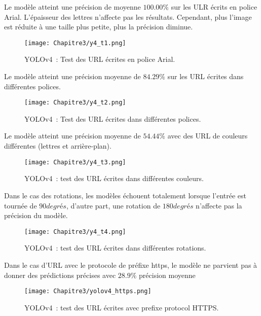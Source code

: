      Le modèle atteint une précision de moyenne $100.00\%$ sur les ULR écrits en police Arial. L'épaisseur des lettres n'affecte pas les résultats. Cependant, plus l'image est réduite à une taille plus petite, plus la précision diminue.
     \begin{figure}[H]
               \centering
               \texttt{[image: Chapitre3/y4\_t1.png]}
               \caption{YOLOv4 : Test des URL écrites en police Arial.}
               \label{y4_t1}
               \end{figure}
     
     Le modèle atteint une précision moyenne de $84.29\%$ sur les URL écrites dans différentes polices.
     \begin{figure}[H]
               \centering
               \texttt{[image: Chapitre3/y4\_t2.png]}
               \caption{YOLOv4 : Test des URL écrites dans différentes polices.}
               \label{y4_t2}
               \end{figure}

     Le modèle atteint une précision moyenne de $54.44\%$ avec des URL de couleurs différentes (lettres et arrière-plan).
     \begin{figure}[H]
               \centering
               \texttt{[image: Chapitre3/y4\_t3.png]}
               \caption{YOLOv4 : test des URL écrites dans différentes couleurs.}
               \label{y4_t3}
               \end{figure}

     Dans le cas des rotations, les modèles échouent totalement lorsque l'entrée est tournée de $90 degrés$, d'autre part, une rotation de $180 degrés$ n'affecte pas la précision du modèle.
     \begin{figure}[H]
               \centering
               \texttt{[image: Chapitre3/y4\_t4.png]}
               \caption{YOLOv4 : test des URL écrites dans différentes rotations.}
               \label{y4_t4}
               \end{figure}
     
     Dans le cas d'URL avec le protocole de préfixe https, le modèle ne parvient pas à donner des prédictions précises avec $28.9\%$ précision moyenne
     \begin{figure}[H]
               \centering
               \texttt{[image: Chapitre3/yolov4\_https.png]}
               \caption{YOLOv4 : test des URL écrites avec prefixe protocol HTTPS.}
               \label{y4_https}
               \end{figure}
     
